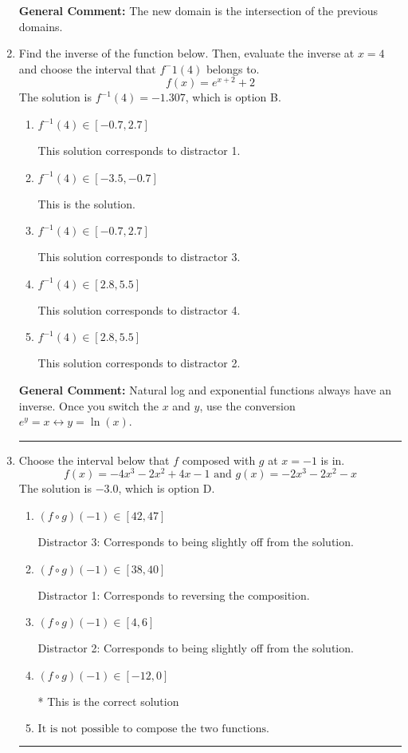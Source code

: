 \documentclass{extbook}[14pt]
\newcommand{\litem}[1]{\item #1

\rule{\textwidth}{0.4pt}}
\begin{document}
\begin{enumerate}
{\textbf{General Comment:} The new domain is the intersection of the previous domains.
}
\litem{
Find the inverse of the function below. Then, evaluate the inverse at $x = 4$ and choose the interval that $f^-1(4)$ belongs to.
\[ f(x) = e^{x+2}+2 \]The solution is \( f^{-1}(4) = -1.307 \), which is option B.\begin{enumerate}[label=\Alph*.]
\item \( f^{-1}(4) \in [-0.7, 2.7] \)

 This solution corresponds to distractor 1.
\item \( f^{-1}(4) \in [-3.5, -0.7] \)

 This is the solution.
\item \( f^{-1}(4) \in [-0.7, 2.7] \)

 This solution corresponds to distractor 3.
\item \( f^{-1}(4) \in [2.8, 5.5] \)

 This solution corresponds to distractor 4.
\item \( f^{-1}(4) \in [2.8, 5.5] \)

 This solution corresponds to distractor 2.
\end{enumerate}

\textbf{General Comment:} Natural log and exponential functions always have an inverse. Once you switch the $x$ and $y$, use the conversion $ e^y = x \leftrightarrow y=\ln(x)$.
}
\litem{
Choose the interval below that $f$ composed with $g$ at $x=-1$ is in.
\[ f(x) = -4x^{3} -2 x^{2} +4 x -1 \text{ and } g(x) = -2x^{3} -2 x^{2} -x \]The solution is \( -3.0 \), which is option D.\begin{enumerate}[label=\Alph*.]
\item \( (f \circ g)(-1) \in [42, 47] \)

 Distractor 3: Corresponds to being slightly off from the solution.
\item \( (f \circ g)(-1) \in [38, 40] \)

 Distractor 1: Corresponds to reversing the composition.
\item \( (f \circ g)(-1) \in [4, 6] \)

 Distractor 2: Corresponds to being slightly off from the solution.
\item \( (f \circ g)(-1) \in [-12, 0] \)

* This is the correct solution
\item \( \text{It is not possible to compose the two functions.} \)


\end{enumerate}

}
\end{enumerate}
\end{document}
